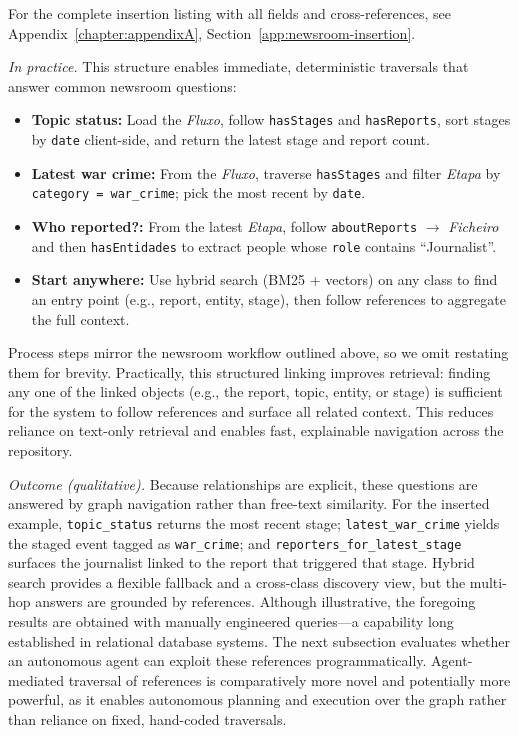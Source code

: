 For the complete insertion listing with all fields and cross-references, see Appendix~\ref{chapter:appendixA}, Section~\ref{app:newsroom-insertion}.

\noindent\textit{In practice.} This structure enables immediate, deterministic traversals that answer common newsroom questions:
\begin{itemize}
    \item \textbf{Topic status:} Load the \textit{Fluxo}, follow \texttt{hasStages} and \texttt{hasReports}, sort stages by \texttt{date} client-side, and return the latest stage and report count.
    \item \textbf{Latest war crime:} From the \textit{Fluxo}, traverse \texttt{hasStages} and filter \textit{Etapa} by \texttt{category = war\_crime}; pick the most recent by \texttt{date}.
    \item \textbf{Who reported?:} From the latest \textit{Etapa}, follow \texttt{aboutReports} $\rightarrow$ \textit{Ficheiro} and then \texttt{hasEntidades} to extract people whose \texttt{role} contains \enquote{Journalist}.
    \item \textbf{Start anywhere:} Use hybrid search (BM25 + vectors) on any class to find an entry point (e.g., report, entity, stage), then follow references to aggregate the full context.
\end{itemize}


Process steps mirror the newsroom workflow outlined above, so we omit restating them for brevity. Practically, this structured linking improves retrieval: finding any one of the linked objects (e.g., the report, topic, entity, or stage) is sufficient for the system to follow references and surface all related context. This reduces reliance on text-only retrieval and enables fast, explainable navigation across the repository.

\noindent\textit{Outcome (qualitative).} Because relationships are explicit, these questions are answered by graph navigation rather than free-text similarity. For the inserted example, \texttt{topic\_status} returns the most recent stage; \texttt{latest\_war\_crime} yields the staged event tagged as \texttt{war\_crime}; and \texttt{reporters\_for\_latest\_stage} surfaces the journalist linked to the report that triggered that stage. Hybrid search provides a flexible fallback and a cross-class discovery view, but the multi-hop answers are grounded by references.
Although illustrative, the foregoing results are obtained with manually engineered queries—a capability long established in relational database systems. The next subsection evaluates whether an autonomous agent can exploit these references programmatically. Agent-mediated traversal of references is comparatively more novel and potentially more powerful, as it enables autonomous planning and execution over the graph rather than reliance on fixed, hand-coded traversals. 
